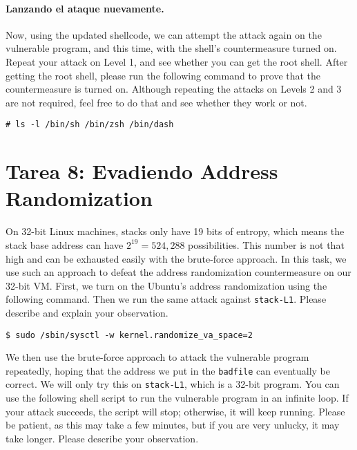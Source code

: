 \paragraph{Lanzando el ataque nuevamente.}
Now, using the updated shellcode, we can attempt the attack 
again on the vulnerable program, and this time, with the 
shell's countermeasure turned on. Repeat your attack
on Level 1, and see whether 
you can get the root shell. After getting the root shell,
please run the following command to prove that the countermeasure
is turned on. Although repeating the attacks on Levels 2 and 3 
are not required, feel free to do that and see whether they work or not.

\begin{lstlisting}
# ls -l /bin/sh /bin/zsh /bin/dash
\end{lstlisting}
 


\section{Tarea 8: Evadiendo Address Randomization}

On 32-bit Linux machines, stacks only have 19 bits of entropy, which means the stack base
address can have $2^{19} = 524,288$ possibilities.  This number is not that high and can be
exhausted easily with the brute-force approach. In this task,
we use such an approach to defeat the address randomization countermeasure 
on our 32-bit VM. 
First, we turn on the Ubuntu's address randomization using the 
following command. Then we run the same attack
against \texttt{stack-L1}.
Please describe and explain your observation.

\begin{lstlisting}
$ sudo /sbin/sysctl -w kernel.randomize_va_space=2
\end{lstlisting}


We then use the brute-force approach to attack the vulnerable program repeatedly, hoping that 
the address we put in the \texttt{badfile} can eventually be correct. We will only try
this on \texttt{stack-L1}, which is a 32-bit program. 
You can use the following shell script to run the vulnerable program in an infinite loop. If your
attack succeeds, the script will stop; otherwise, it will keep running. Please be patient,
as this may take a few minutes, but if you are very unlucky,
it may take longer. Please describe your observation.


